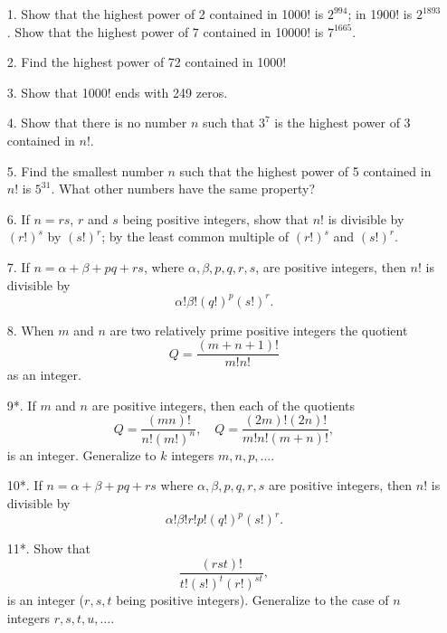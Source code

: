 \documentclass[oneside]{book}
\begin{document}
\small \begin{enumerate}
\item[1.] Show that the highest power of 2 contained in 1000! is
$2^{994}$; in 1900! is $2^{1893}$. Show that the highest power of 7
contained in 10000! is $7^{1665}$.

\item[2.] Find the highest power of 72 contained in 1000!

\item[3.] Show that 1000! ends with 249 zeros.

\item[4.] Show that there is no number $n$ such that $3^7$ is the
highest power of 3 contained in $n!$.

\item[5.] Find the smallest number $n$ such that the highest power
of 5 contained in $n!$ is $5^{31}$. What other numbers have the same
property?

\item[6.] If $n = rs$, $r$ and $s$ being positive integers, show that
$n!$ is divisible by $(r!)^s$ by $(s!)^r$; by the least common
multiple of $(r!)^s$ and $(s!)^r$.

\item[7.] If $n = \alpha + \beta + pq + rs$, where $\alpha, \beta, p,
q, r, s$, are positive integers, then $n!$ is divisible by
\begin{equation*}
\alpha ! \beta ! (q!)^p (s!)^r.
\end{equation*}

\item[8.] When $m$ and $n$ are two relatively prime positive integers
the quotient
\begin{equation*}
Q = \frac{(m + n + 1)!} {m! n!}
\end{equation*}
as an integer.

\item[9*.] If $m$ and $n$ are positive integers, then each of the
quotients
\begin{equation*}
Q = \frac{(mn)!} {n! (m!)^n},\quad
Q = \frac{(2m)! (2n)!} {m! n! (m+n)!},
\end{equation*}
is an integer. Generalize to $k$ integers $m, n, p, \ldots$.

\item[10*.] If $n = \alpha + \beta + pq + rs$ where $\alpha, \beta,
p, q, r, s$ are positive integers, then $n!$ is divisible by
\begin{equation*}
\alpha! \beta! r! p! (q!)^p (s!)^r.
\end{equation*}

\item[11*.] Show that
\begin{equation*}
\frac{(rst)!} {t! (s!)^t (r!)^{st}},
\end{equation*} is an integer ($r, s, t$ being positive integers).
Generalize to the case of $n$ integers $r, s, t, u, \ldots$.
\end{enumerate}\normalsize%
\end{document}
